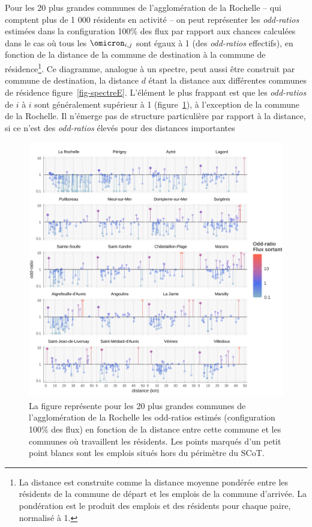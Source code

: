 \documentclass[
  10pt,
  a4paper,
  numbers=noendperiod,
  DIV=9]{scrreprt}
\begin{document}
Pour les 20 plus grandes communes de l'agglomération de la Rochelle --
qui comptent plus de 1 000 résidents en activité -- on peut représenter
les \emph{odd-ratios} estimées dans la configuration 100\% des flux par
rapport aux chances calculées dans le cas où tous les \(\omicron_{i,j}\)
sont égaux à 1 (des \emph{odd-ratios} effectifs), en fonction de la
distance de la commune de destination à la commune de
résidence\footnote{La distance est construite comme la distance moyenne
  pondérée entre les résidents de la commune de départ et les emplois de
  la commune d'arrivée. La pondération est le produit des emplois et des
  résidents pour chaque paire, normalisé à 1.}. Ce diagramme, analogue à
un spectre, peut aussi être construit par commune de destination, la
distance \(d\) étant la distance aux différentes communes de résidence
figure~\ref{fig-spectreE}. L'élément le plus frappant est que les
\emph{odd-ratios} de \(i\) à \(i\) sont généralement supérieur à 1
(figure~\ref{fig-spectreR}), à l'exception de la commune de la Rochelle.
Il n'émerge pas de structure particulière par rapport à la distance, si
ce n'est des \emph{odd-ratios} élevés pour des distances importantes

\begin{figure}[htb]

{\centering \includegraphics[width=1\textwidth,height=\textheight]{./output/spectre effectif par COMMUNE 100.png}

}

\caption[Odd-ratio par commune de résidence fonction de la distance aux
communes d'emploi (spectre résidents)]{\label{fig-spectreR}La figure
représente pour les 20 plus grandes communes de l'agglomération de la
Rochelle les odd-ratios estimés (configuration 100\% des flux) en
fonction de la distance entre cette commune et les communes où
travaillent les résidents. Les points marqués d'un petit point blancs
sont les emplois situés hors du périmètre du SCoT.}

\end{figure}
\end{document}
